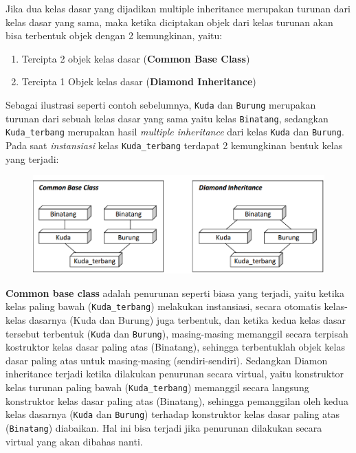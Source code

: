 Jika dua kelas dasar yang dijadikan multiple inheritance merupakan
turunan dari kelas dasar yang sama, maka ketika diciptakan objek dari
kelas turunan akan bisa terbentuk objek dengan 2 kemungkinan, yaitu:

\begin{enumerate}
\def\labelenumi{\arabic{enumi}.}
\tightlist
\item
  Tercipta 2 objek kelas dasar (\textbf{Common Base Class})
\item
  Tercipta 1 Objek kelas dasar (\textbf{Diamond Inheritance})
\end{enumerate}

Sebagai ilustrasi seperti contoh sebelumnya, \texttt{Kuda} dan
\texttt{Burung} merupakan turunan dari sebuah kelas dasar yang sama
yaitu kelas \texttt{Binatang}, sedangkan \texttt{Kuda\_terbang}
merupakan hasil \emph{multiple inheritance} dari kelas \texttt{Kuda} dan
\texttt{Burung}. Pada saat \emph{instansiasi} kelas
\texttt{Kuda\_terbang} terdapat 2 kemungkinan bentuk kelas yang terjadi:

\begin{figure}[htbp]
\centering
\includegraphics{images/capture9-3.png}
\caption{}
\end{figure}

\textbf{Common base class} adalah penurunan seperti biasa yang terjadi,
yaitu ketika kelas paling bawah (\texttt{Kuda\_terbang}) melakukan
instansiasi, secara otomatis kelas-kelas dasarnya (Kuda dan Burung) juga
terbentuk, dan ketika kedua kelas dasar tersebut terbentuk
(\texttt{Kuda} dan \texttt{Burung}), masing-masing memanggil secara
terpisah kostruktor kelas dasar paling atas (Binatang), sehingga
terbentuklah objek kelas dasar paling atas untuk masing-masing
(sendiri-sendiri). Sedangkan Diamon inheritance terjadi ketika dilakukan
penurunan secara virtual, yaitu konstruktor kelas turunan paling bawah
(\texttt{Kuda\_terbang}) memanggil secara langsung konstruktor kelas
dasar paling atas (Binatang), sehingga pemanggilan oleh kedua kelas
dasarnya (\texttt{Kuda} dan \texttt{Burung}) terhadap konstruktor kelas
dasar paling atas (\texttt{Binatang}) diabaikan. Hal ini bisa terjadi
jika penurunan dilakukan secara virtual yang akan dibahas nanti.

